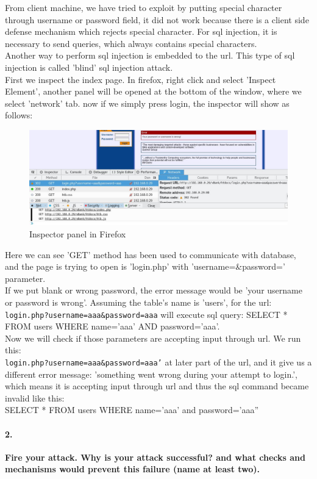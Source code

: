 \documentclass[12pt]{report}
\begin{document}
	From client machine, we have tried to exploit by putting special character through username or password field, it did not work because there is a client side defense mechanism which rejects special character. For sql injection, it is necessary to send queries, which always contains special characters.\\
	Another way to perform sql injection is embedded to the url. This type of sql injection is called 'blind' sql injection attack.\\
	First we inspect the index page. In firefox, right click and select 'Inspect Element', another panel will be opened at the bottom of the window, where we select 'network' tab. now if we simply press login, the inspector will show as follows:
	\begin{figure}[H]
		\includegraphics[width=0.75\textheight]{images/getmethod.jpg}
		\caption{Inspector panel in Firefox}
	\end{figure}
	Here we can see 'GET' method has been used to communicate with database, and the page is trying to open is 'login.php' with 'username=\&password=' parameter.\\
	If we put blank or wrong password, the error message would be 'your username or password is wrong'. Assuming the table's name is 'users', for the url: {\tt login.php?username=aaa\&password=aaa} will execute  sql query: {\sf SELECT * FROM users WHERE name='aaa' AND password='aaa'}.\\
	Now we will check if those parameters are accepting input through url. We run this: \\{\tt login.php?username=aaa\&password=aaa'} at later part of the url, and it give us a different error message: 'something went wrong during your attempt to login.', which means it is accepting input through url and thus the sql command became invalid like this:\\ {\sf SELECT * FROM users WHERE name='aaa' and password='aaa''}\\
	
	\paragraph*{2.} {\bf Fire your attack. Why is your attack successful? and what checks and mechanisms would prevent this failure (name at least two).}\\
	
\end{document}
